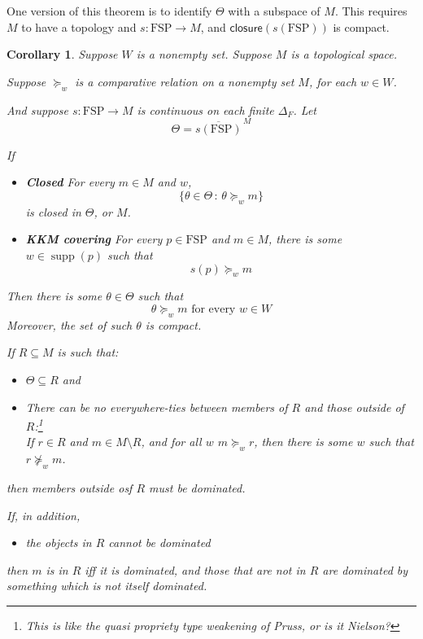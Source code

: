 \documentclass[11pt]{article}
\newtheorem{corollary}[theorem]{Corollary}
\theoremstyle{definition}
\theoremstyle{remark}
\newcommand{\supp}{\operatorname{supp}}
\newcommand{\given}{\,:\,}
\newcommand{\FSP}{\mathrm{FSP}}
\newcommand{\closure}{\mathsf{closure}}
\begin{document}
One version of this theorem is to identify $\Theta$ with a subspace of $M$. This requires $M$ to have a topology and $s:\FSP\to M$, and $\closure(s(\FSP))$ is compact. 

\begin{center}
\end{center}


\begin{corollary}
	Suppose $W$ is a nonempty set. Suppose $M$ is a topological space.
	
	Suppose $\succeq_w$ is a comparative relation on a nonempty set $M$, for each $w\in W$. 
	
	And suppose $s:\FSP\to M$ is continuous on each finite $\Delta_F$. Let $$\Theta=\overline{s(\FSP)}^{\,M}$$
	
	If \begin{itemize}
		\item \textbf{Closed} For every $m\in M$ and $w$, \[\{\theta\in\Theta\given \theta\succeq_w m\}\] is closed in $\Theta$, or $M$.
		\item \textbf{KKM covering} For every $p\in \FSP$ and $m\in M$, there is some $w\in\supp(p)$ such that $$s(p)\succeq_w m$$
	\end{itemize}
	Then there is some $\theta\in\Theta$ such that 
	\[
	\theta\succeq_w m
	\text{ for every }w\in W
	\] 
	Moreover, the set of such $\theta$ is compact.
	
	If $R\subseteq M$ is such that:
	\begin{itemize}
		\item $\Theta\subseteq R$ and
		\item There can be no everywhere-ties between members of $R$ and those outside of $R$:\footnote{This is like the quasi propriety type weakening of Pruss, or is it Nielson?} \\
		If $r\in R$ and $m\in M\setminus R$, and for all $w$ $m\succeq_w r$, then there is some $w$ such that $r\not\succeq_w m$.
	\end{itemize}then members outside osf $R$ must be dominated. 
	
	If, in addition, \begin{itemize}
		\item the objects in $R$ cannot be dominated
	\end{itemize} then $m$ is in $R$ iff it is dominated, and those that are not in $R$ are dominated by something which is not itself dominated. 
\end{corollary}
\end{document}
